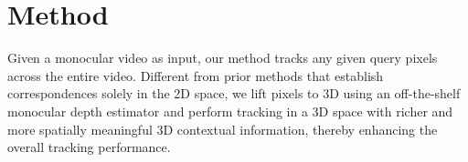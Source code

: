 \section{Method} \label{sec:method}








Given a monocular video as input, our method tracks any given query pixels across the entire video. Different from prior methods that establish correspondences solely in the 2D space, we lift pixels to 3D using an off-the-shelf monocular depth estimator and perform tracking in a 3D space with richer and more spatially meaningful 3D contextual information, thereby enhancing the overall tracking performance.

